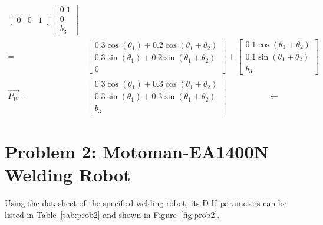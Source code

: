 \documentclass[conference]{IEEEtran}
\begin{document}
\begin{small}
\begin{align*}
\begin{bmatrix}
                                                          0             & 0                 & 1
                                                      \end{bmatrix}     \begin{bmatrix}
                                                                            0.1 \\
                                                                            0   \\
                                                                            b_3
                                                                        \end{bmatrix}                      \\
        =                             & \begin{bmatrix}
                                            0.3\cos \left(\theta_1\right) + 0.2\cos \left(\theta_1 + \theta_2\right) \\
                                            0.3\sin \left(\theta_1\right) + 0.2\sin \left(\theta_1 + \theta_2\right) \\
                                            0
                                        \end{bmatrix}
        + \begin{bmatrix}
              0.1\cos \left(\theta_1 + \theta_2\right) \\
              0.1\sin \left(\theta_1 + \theta_2\right) \\
              b_3
          \end{bmatrix}                                                               \\
        \vec{\mathbf{\mathit{P_W}}} = & \begin{bmatrix}
                                            0.3\cos \left(\theta_1\right) + 0.3\cos \left(\theta_1 + \theta_2\right) \\
                                            0.3\sin \left(\theta_1\right) + 0.3\sin \left(\theta_1 + \theta_2\right) \\
                                            b_3
                                        \end{bmatrix} \quad \quad \quad \quad \quad \longleftarrow
    \end{align*}
\end{small}


\section{Problem 2:  Motoman-EA1400N Welding Robot}
Using the datasheet \cite{b3} of the specified welding robot, its D-H parameters can be listed in Table~\ref{tab:prob2} and shown in Figure~\ref{fig:prob2}.
\end{document}
